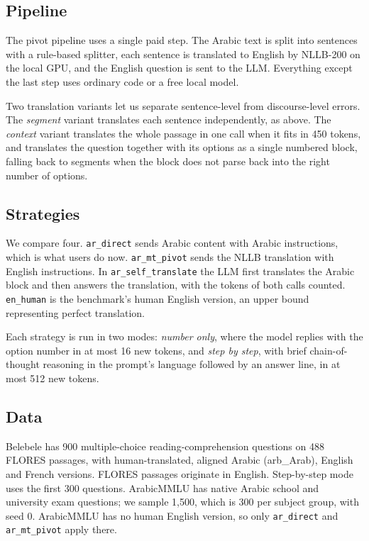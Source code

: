 \documentclass[conference,a4paper]{IEEEtran}
\begin{document}
\subsection{Pipeline}

The pivot pipeline uses a single paid step. The Arabic text is split into
sentences with a rule-based splitter, each sentence is translated to English by
NLLB-200 \cite{nllb} on the local GPU, and the English question is sent to the
LLM. Everything except the last step uses ordinary code or a free local model.

Two translation variants let us separate sentence-level from discourse-level
errors. The \emph{segment} variant translates each sentence independently, as
above. The \emph{context} variant translates the whole passage in one call when
it fits in 450 tokens, and translates the question together with its options as
a single numbered block, falling back to segments when the block does not parse
back into the right number of options.

\subsection{Strategies}

We compare four. \texttt{ar\_direct} sends Arabic content with Arabic
instructions, which is what users do now. \texttt{ar\_mt\_pivot} sends the NLLB
translation with English instructions. In \texttt{ar\_self\_translate} the LLM
first translates the Arabic block and then answers the translation, with the
tokens of both calls counted. \texttt{en\_human} is the benchmark's human
English version, an upper bound representing perfect translation.

Each strategy is run in two modes: \emph{number only}, where the model replies
with the option number in at most 16 new tokens, and \emph{step by step}, with
brief chain-of-thought reasoning \cite{wei} in the prompt's language followed
by an answer line, in at most 512 new tokens.

\subsection{Data}

Belebele \cite{belebele} has 900 multiple-choice reading-comprehension
questions on 488 FLORES passages, with human-translated, aligned Arabic
(arb\_Arab), English and French versions. FLORES passages originate in English.
Step-by-step mode uses the first 300 questions. ArabicMMLU \cite{arabicmmlu}
has native Arabic school and university exam questions; we sample 1,500, which
is 300 per subject group, with seed 0. ArabicMMLU has no human English version,
so only \texttt{ar\_direct} and \texttt{ar\_mt\_pivot} apply there.
\end{document}
